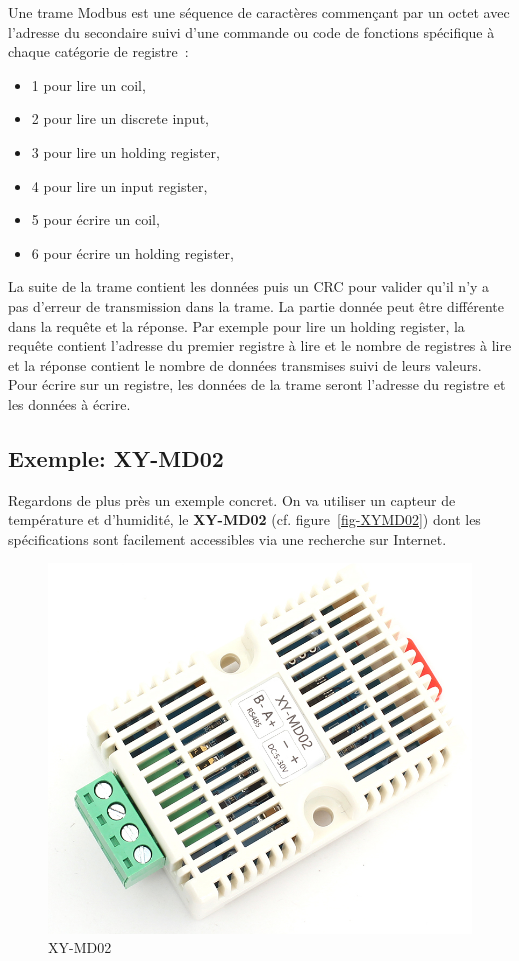 \documentclass[11pt,fleqn]{book} %
\let\oldac\ac
\renewcommand*{\ac}[1]{\oldac{#1}\index{#1}}
\newcommand\Index[1]{\textbf{#1}\index{#1}}
\begin{document}
 

Une trame Modbus est une séquence de caractères commençant par un octet avec l'adresse du secondaire suivi d'une commande ou code de fonctions spécifique à chaque catégorie de registre~:
\begin{itemize}
    \item 1 pour lire un coil,
    \item 2 pour lire un discrete input,
    \item 3 pour lire un holding register,
    \item 4 pour lire un input register,
    \item 5 pour écrire un coil,
    \item 6 pour écrire un holding register,
\end{itemize}

    \vspace{1em}

La suite de la trame contient les données puis un \ac{CRC} pour valider qu'il n'y a pas d'erreur de transmission dans la trame. La partie donnée peut être différente dans la requête et la réponse. Par exemple pour lire un holding register, la requête contient l'adresse du premier registre à lire et le nombre de registres à lire et la réponse contient le nombre de données transmises suivi de leurs valeurs. Pour écrire sur un registre, les données de la trame seront l'adresse du registre et les données à écrire.

\subsection{Exemple: XY-MD02}


Regardons de plus près un exemple concret. On va utiliser un capteur de température et d'humidité, le \Index{XY-MD02} (cf. figure~\vref{fig-XYMD02}) dont les spécifications sont facilement accessibles via une recherche sur Internet. 

\begin{figure}[tbp]
\centerline{\includegraphics[width=0.5\columnwidth]{Pictures/XY-MD02.png}}
\caption{XY-MD02}
\label{fig-XYMD02}
\end{figure}
\end{document}
